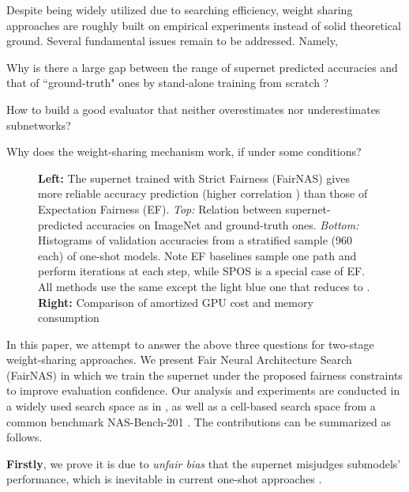 \documentclass[10pt,twocolumn,letterpaper]{article}
\theoremstyle{definition}
\begin{document}
Despite being widely utilized due to searching efficiency, weight sharing approaches are roughly built on empirical experiments instead of solid theoretical ground. Several fundamental issues remain to be addressed.  Namely, 
\begin{enumerate*}
\item Why is there a large gap between the range of supernet predicted accuracies and that of ``ground-truth" ones by stand-alone training from scratch \cite{brock2017smash,bender2018understanding}? 
\item How to build a good evaluator that neither overestimates nor underestimates subnetworks? 
\item Why does the weight-sharing mechanism work, if under some conditions?
\end{enumerate*}


\begin{figure*}[ht]
\centering
{}
\caption{\textbf{Left:} The supernet trained with Strict Fairness (FairNAS) gives more reliable accuracy prediction (higher correlation ) than those of Expectation Fairness (EF). \emph{Top:} Relation between supernet-predicted accuracies on ImageNet and ground-truth ones.
\emph{Bottom:} Histograms of validation accuracies from a stratified sample (960 each) of one-shot models.  Note EF baselines sample one path and perform  iterations at each step, while SPOS \cite{guo2019single} is a special case of EF. All methods use the same  except the light blue one that reduces to . \textbf{Right:} Comparison of amortized GPU cost and memory consumption} 
\label{fig:fairness-hist}
\end{figure*} 

In this paper, we attempt to answer the above three questions for two-stage weight-sharing approaches. We  present Fair Neural Architecture Search (FairNAS) in which we train the supernet under the proposed fairness constraints to improve evaluation confidence. Our analysis and experiments are conducted in a widely used search space as in \cite{cai2018proxylessnas,wu2018fbnet,guo2019single,stamoulis2019single}, as well as a cell-based search space from a common benchmark NAS-Bench-201 \cite{dong2019bench}. The contributions can be summarized as follows. 


\textbf{Firstly}, we prove it is due to \emph{unfair bias} that the supernet misjudges submodels' performance, which is inevitable in current one-shot approaches \cite{brock2017smash,bender2018understanding}.
\end{document}
